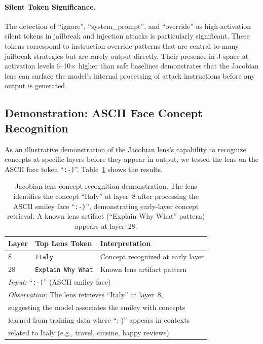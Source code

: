 \documentclass[11pt]{article}
\begin{document}
\paragraph{Silent Token Significance.}
The detection of ``ignore'', ``system\_prompt'', and ``override'' as high-activation silent tokens in jailbreak and injection attacks is particularly significant. These tokens correspond to instruction-override patterns that are central to many jailbreak strategies but are rarely output directly. Their presence in J-space at activation levels 6--10$\times$ higher than safe baselines demonstrates that the Jacobian lens can surface the model's internal processing of attack instructions before any output is generated.

\subsection{Demonstration: ASCII Face Concept Recognition}

As an illustrative demonstration of the Jacobian lens's capability to recognize concepts at specific layers before they appear in output, we tested the lens on the ASCII face token ``\texttt{:-)}''. Table~\ref{tab:ascii_demo} shows the results.

\begin{table}[H]
\centering
\caption{Jacobian lens concept recognition demonstration. The lens identifies the concept ``Italy'' at layer~8 after processing the ASCII smiley face ``\texttt{:-)}'', demonstrating early-layer concept retrieval. A known lens artifact (``Explain Why What'' pattern) appears at layer~28.}
\label{tab:ascii_demo}
\begin{tabular}{lll}
\toprule
\textbf{Layer} & \textbf{Top Lens Token} & \textbf{Interpretation} \\
\midrule
 8  & \texttt{Italy}               & Concept recognized at early layer \\
28  & \texttt{Explain Why What}    & Known lens artifact pattern \\
\midrule
\multicolumn{3}{l}{\small \textit{Input:} ``\texttt{:-)}'' (ASCII smiley face)} \\
\multicolumn{3}{l}{\small \textit{Observation:} The lens retrieves ``Italy'' at layer~8,} \\
\multicolumn{3}{l}{\small suggesting the model associates the smiley with concepts} \\
\multicolumn{3}{l}{\small learned from training data where ``:-)'' appears in contexts} \\
\multicolumn{3}{l}{\small related to Italy (e.g., travel, cuisine, happy reviews).} \\
\bottomrule
\end{tabular}
\end{table}
\end{document}
